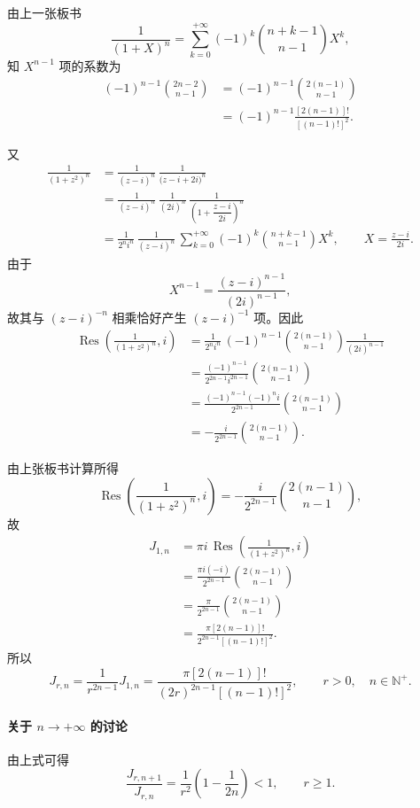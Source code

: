 由上一张板书
\[
  \frac{1}{(1+X)^n}
  =\sum_{k=0}^{+\infty}(-1)^k
    \binom{n+k-1}{n-1}X^k,
\]
知 $X^{n-1}$ 项的系数为
\begin{align*}
  (-1)^{n-1}\binom{2n-2}{n-1}
  &=(-1)^{n-1}\binom{2(n-1)}{n-1}\\
  &=(-1)^{n-1}\frac{[2(n-1)]!}{[(n-1)!]^2}.
\end{align*}

又
\begin{align*}
  \frac{1}{(1+z^2)^n}
  &=\frac{1}{(z-i)^n}\,
    \frac{1}{\bigl(z-i+2i\bigr)^n}\\
  &=\frac{1}{(z-i)^n}\,
    \frac{1}{(2i)^n}\,
    \frac{1}{\left(1+\dfrac{z-i}{2i}\right)^n}\\
  &=\frac{1}{2^n i^n}\,
    \frac{1}{(z-i)^n}\,
    \sum_{k=0}^{+\infty}(-1)^k
    \binom{n+k-1}{n-1}X^k,
    \qquad X=\frac{z-i}{2i}.
\end{align*}
由于
\[
  X^{n-1}=\frac{(z-i)^{n-1}}{(2i)^{n-1}},
\]
故其与 $(z-i)^{-n}$ 相乘恰好产生 $(z-i)^{-1}$ 项。因此
\begin{align*}
  \operatorname{Res}
  \left(\frac{1}{(1+z^2)^n},i\right)
  &=\frac{1}{2^n i^n}\,
    (-1)^{n-1}\binom{2(n-1)}{n-1}
    \frac{1}{(2i)^{n-1}}\\
  &=\frac{(-1)^{n-1}}{2^{2n-1}i^{2n-1}}
    \binom{2(n-1)}{n-1}\\
  &=\frac{(-1)^{n-1}(-1)^n i}{2^{2n-1}}
    \binom{2(n-1)}{n-1}\\
  &=-\frac{i}{2^{2n-1}}\binom{2(n-1)}{n-1}.
\end{align*}



由上张板书计算所得
\[
  \operatorname{Res}\left(\frac{1}{(1+z^2)^n},i\right)
  =-\frac{i}{2^{2n-1}}\binom{2(n-1)}{n-1},
\]
故
\begin{align*}
  J_{1,n}
  &=\pi i\,\operatorname{Res}
    \left(\frac{1}{(1+z^2)^n},i\right)\\
  &=\frac{\pi i(-i)}{2^{2n-1}}\binom{2(n-1)}{n-1}\\
  &=\frac{\pi}{2^{2n-1}}\binom{2(n-1)}{n-1}\\
  &=\frac{\pi[2(n-1)]!}{2^{2n-1}[(n-1)!]^2}.
\end{align*}
所以
\[
  \boxed{
    J_{r,n}=\frac{1}{r^{2n-1}}J_{1,n}
    =\frac{\pi[2(n-1)]!}{(2r)^{2n-1}[(n-1)!]^2}
  },\qquad r>0,\quad n\in\mathbb N^+.
\]

\paragraph{关于 $n\to+\infty$ 的讨论}
由上式可得
\[
  \frac{J_{r,n+1}}{J_{r,n}}
  =\frac{1}{r^2}\left(1-\frac{1}{2n}\right)<1,
  \qquad r\ge1.
\]


